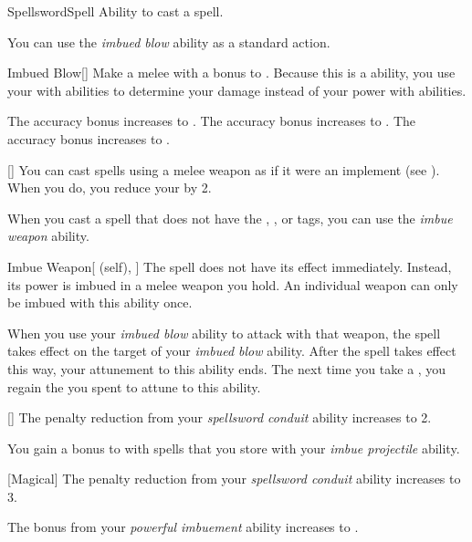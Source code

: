     \begin{feat}{Spellsword}{Spell}
        \featpre Ability to cast a spell.

         You can use the \textit{imbued blow} ability as a standard action.
        \begin{freeability}{Imbued Blow}[]
            Make a melee  with a  bonus to .
            Because this is a  ability, you use your  with  abilities to determine your damage instead of your power with  abilities.

            \rankline
             The accuracy bonus increases to .
             The accuracy bonus increases to .
             The accuracy bonus increases to .
        \end{freeability}

        [] You can cast spells using a melee weapon as if it were an implement (see ).
        When you do, you reduce your  by 2.

         When you cast a spell that does not have the , , or  tags,
            you can use the \textit{imbue weapon} ability.
        \begin{attuneability}{Imbue Weapon}[ (self), ]
            The spell does not have its effect immediately.
            Instead, its power is imbued in a melee weapon you hold.
            An individual weapon can only be imbued with this ability once.

            When you use your \textit{imbued blow} ability to attack with that weapon, the spell takes effect on the target of your \textit{imbued blow} ability.
            After the spell takes effect this way, your attunement to this ability ends.
            The next time you take a , you regain the  you spent to attune to this ability.
        \end{attuneability}

        [] The penalty reduction from your \textit{spellsword conduit} ability increases to 2.

         You gain a  bonus to  with spells that you store with your \textit{imbue projectile} ability.

        [Magical] The penalty reduction from your \textit{spellsword conduit} ability increases to 3.

         The bonus from your \textit{powerful imbuement} ability increases to .
    \end{feat}

